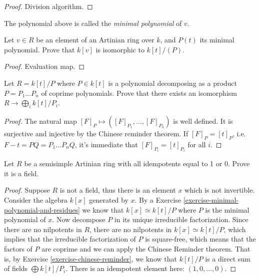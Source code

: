 \begin{proof}
Division algorithm.
\end{proof}

\noindent
The polynomial above is called the {\it
minimal polynomial} of $v$.

\begin{exercise}
\label{exercise-minim-polyn-resid}
Let $v \in R$ be an element of an Artinian
ring over $k$,
and $P(t)$ its minimal polynomial.
Prove that $k[v]$ is isomorphic to
$k[t]/(P)$.
\end{exercise}

\begin{proof}
Evaluation map.
\end{proof}

\begin{exercise}
\label{exercise-chinese-reminder}
Let $R=k[t]/P$ where $P \in k[t]$ is a
polynomial
decomposing as a product $P=P_1…P_n$ of
coprime polynomials.
Prove that there exists an isomorphism
$R \to \bigoplus_ik[t]/P_i$.
\end{exercise}

\begin{proof}
The natural map $[F]_P \mapsto
([F]_{P_1},…,[F]_{P_n})$
is well defined.
It is surjective and injective by the Chinese
reminder theorem.
If $[F]_P = [t]_P$, i.e.
$F-t=PQ=P_1…P_nQ$, it's immediate that
$[F]_{P_i}=[t]_{P_i}$ for all $i$.
\end{proof}

\begin{exercise}
\label{exercise-artin-witho-idemp-field}
Let $R$ be a semisimple Artinian ring with
all idempotents
equal to 1 or 0. Prove it is a field.
\end{exercise}

\begin{proof}
Suppose $R$ is not a field, thus
there is an element $x$ which
is not invertible. Consider the
algebra $k[x]$ generated by $x$.
By a Exercise \ref{exercise-minimal-
polynomial-and-residues}
we know that $k[x] \simeq k[t]/P$
where $P$ is the minimal polynomial
of $x$.
Now decompose $P$ in its unique
irreducible factorization.
Since there are no nilpotents in $R$,
there are no nilpotents in
$k[x] \simeq k[t]/P$,
which implies that the irreducible
factorization of $P$
is square-free, which means that
the factors of $P$
are coprime and we can apply the
Chinese Reminder theorem.
That is, by Exercise
\ref{exercise-chinese-reminder},
we know that $k[t]/P$ is a direct
sum of fields
$\bigoplus k[t]/P_i$.
There is an idempotent element
here:
$(1,0,…,0)$.
\end{proof}

